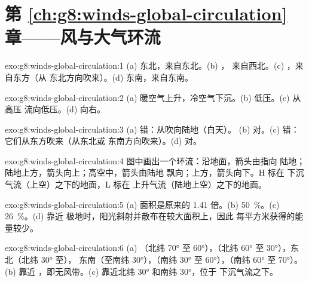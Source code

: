 \section*{第 \ref{ch:g8:winds-global-circulation} 章——风与大气环流}

\begin{solution}{exo:g8:winds-global-circulation:1}
(a) 东北，来自东北。(b) ，
来自西北。(c) ，来自东方（从
东北方向吹来）。(d) 东南，来自东南。
\end{solution}

\begin{solution}{exo:g8:winds-global-circulation:2}
(a) 暖空气上升，冷空气下沉。(b) 低压。(c) 从高压
流向低压。(d) 向右。
\end{solution}

\begin{solution}{exo:g8:winds-global-circulation:3}
(a) 错：从吹向陆地（白天）。
(b) 对。(c) 错：它们从东方吹来（从东北或
东南方向吹来）。(d) 对。
\end{solution}

\begin{solution}{exo:g8:winds-global-circulation:4}
图中画出一个环流：沿地面，箭头由指向
陆地；陆地上方，箭头向上；高空中，箭头由陆地
飘向；上方，箭头向下。H 标在
下沉气流（上空）之下的地面，L 标在
上升气流（陆地上空）之下的地面。
\end{solution}

\begin{solution}{exo:g8:winds-global-circulation:5}
(a) 面积是原来的 1.41 倍。(b) 50~\%。(c) 26~\%。(d) 靠近
极地时，阳光斜射并散布在较大面积上，因此
每平方米获得的能量较少。
\end{solution}

\begin{solution}{exo:g8:winds-global-circulation:6}
(a) （北纬 \ang{70} 至 \ang{60}），（北纬 \ang{60} 至
\ang{30}），东北（北纬 \ang{30} 至），
东南（至南纬 \ang{30}），（南纬 \ang{30} 至
\ang{60}），（南纬 \ang{60} 至 \ang{70}）。(b) 靠近
，即无风带。(c) 靠近北纬 \ang{30} 和南纬 \ang{30}，位于
下沉气流之下。
\end{solution}

